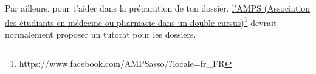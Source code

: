 \bigskip

Par ailleurs, pour t'aider dans la préparation de ton dossier, \href{https://www.facebook.com/AMPSasso/?locale=fr_FR}{l’AMPS (Association des étudiants en médecine ou pharmacie dans un double cursus)}\footnote{https://www.facebook.com/AMPSasso/?locale=fr_FR} devrait normalement proposer un tutorat pour les dossiers.